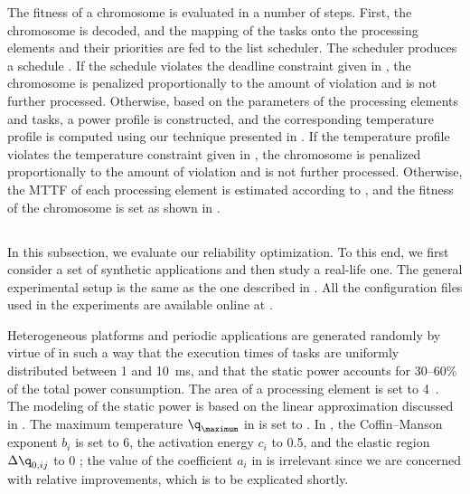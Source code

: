 The fitness of a chromosome is evaluated in a number of steps. First, the
chromosome is decoded, and the mapping of the tasks onto the processing elements
and their priorities are fed to the list scheduler. The scheduler produces a
schedule \schedule. If the schedule violates the deadline constraint given in
, the chromosome is penalized proportionally
to the amount of violation and is not further processed. Otherwise, based on the
parameters of the processing elements and tasks, a power profile \mp is
constructed, and the corresponding temperature profile \mq is computed using our
technique presented in . If the temperature
profile violates the temperature constraint given in
, the chromosome is penalized proportionally
to the amount of violation and is not further processed. Otherwise, the
\ac{MTTF} of each processing element is estimated according to
, and the fitness of the chromosome is set as
shown in .

\subsection{\resultstitle}

In this subsection, we evaluate our reliability optimization. To this end, we
first consider a set of synthetic applications and then study a real-life one.
The general experimental setup is the same as the one described in
. All the configuration files used in the
experiments are available online at \cite{eslab2012}.

Heterogeneous platforms and periodic applications are generated randomly by
virtue of  \cite{dick1998} in such a way that the execution times of
tasks are uniformly distributed between 1 and 10~ms, and that the static power
accounts for 30--60\% of the total power consumption. The area of a processing
element is set to 4~. The modeling of the static power is based on
the linear approximation discussed in . The maximum
temperature $\q_\maximum$ in  is set to
. In , the Coffin--Manson
exponent $b_i$ is set to 6, the activation energy $c_i$ to 0.5, and the elastic
region $\Delta \q_{0, ij}$ to 0 \cite{jedec2016}; the value of the coefficient
$a_i$ in  is irrelevant since we are concerned
with relative improvements, which is to be explicated shortly.

